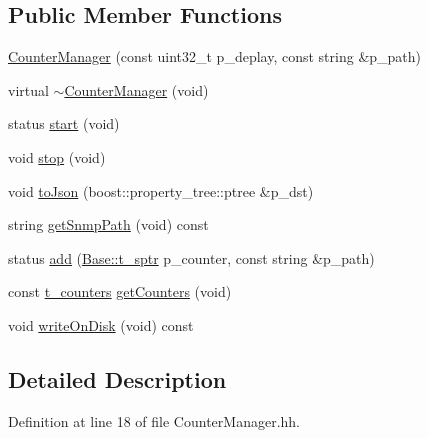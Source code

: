 \subsection*{Public Member Functions}
\begin{DoxyCompactItemize}
\item 
\hyperlink{classxtd_1_1counters_1_1CounterManager_a13c765c1d8c326d3a040c779975d0149}{Counter\-Manager} (const uint32\-\_\-t p\-\_\-deplay, const string \&p\-\_\-path)
\item 
virtual \hyperlink{classxtd_1_1counters_1_1CounterManager_aff5438182c449dd719382d2d8ca2b1c8}{$\sim$\-Counter\-Manager} (void)
\item 
status \hyperlink{classxtd_1_1counters_1_1CounterManager_a65755963d9293fa457c6562a38b2dff3}{start} (void)
\item 
void \hyperlink{classxtd_1_1counters_1_1CounterManager_a2b50e714f748fc2298bd3ca0c77c668d}{stop} (void)
\item 
void \hyperlink{classxtd_1_1counters_1_1CounterManager_a1677a12619a23ba162a19ebc74fe41e9}{to\-Json} (boost\-::property\-\_\-tree\-::ptree \&p\-\_\-dst)
\item 
string \hyperlink{classxtd_1_1counters_1_1CounterManager_a01f164d28b794064ed5cba2ab94e3583}{get\-Snmp\-Path} (void) const 
\item 
status \hyperlink{classxtd_1_1counters_1_1CounterManager_a7e0f54fa25b0d8592362159604cc4310}{add} (\hyperlink{classxtd_1_1counters_1_1Base_aa0ea634f1a5e3df87418566a3e8fcbd6}{Base\-::t\-\_\-sptr} p\-\_\-counter, const string \&p\-\_\-path)
\item 
const \hyperlink{classxtd_1_1counters_1_1CounterManager_ae675635fccfde42cc3831d07adacd2cb}{t\-\_\-counters} \hyperlink{classxtd_1_1counters_1_1CounterManager_afb314857888b269ca3ea0f2b4870b3e5}{get\-Counters} (void)
\item 
void \hyperlink{classxtd_1_1counters_1_1CounterManager_a6b9bb7cbdc06c137d04d7a944232b264}{write\-On\-Disk} (void) const 
\end{DoxyCompactItemize}


\subsection{Detailed Description}


Definition at line 18 of file Counter\-Manager.\-hh.



